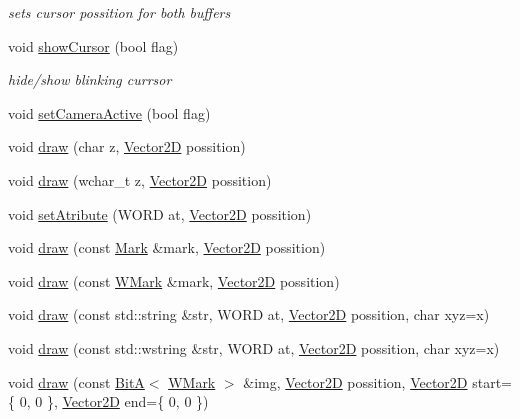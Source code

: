 \begin{DoxyCompactItemize}
\begin{DoxyCompactList}\small\item\em sets cursor possition for both buffers \end{DoxyCompactList}\item 
void \mbox{\hyperlink{classsc_1_1_console_abcbb6154c7265d8a31b46338faa4ea8f}{show\+Cursor}} (bool flag)
\begin{DoxyCompactList}\small\item\em hide/show blinking currsor \end{DoxyCompactList}\item 
void \mbox{\hyperlink{classsc_1_1_console_aa50c09dfc2a61531e5bb12456819485a}{set\+Camera\+Active}} (bool flag)
\item 
void \mbox{\hyperlink{classsc_1_1_console_a40d14517dcebf7f4ded1656efdbf5bcf}{draw}} (char z, \mbox{\hyperlink{classsc_1_1_vector2_d}{Vector2D}} possition)
\item 
void \mbox{\hyperlink{classsc_1_1_console_a86c67142b3b25386f0a2333e80db62d3}{draw}} (wchar\+\_\+t z, \mbox{\hyperlink{classsc_1_1_vector2_d}{Vector2D}} possition)
\item 
void \mbox{\hyperlink{classsc_1_1_console_af65001cc3911780cf555fdab60040a0d}{set\+Atribute}} (W\+O\+RD at, \mbox{\hyperlink{classsc_1_1_vector2_d}{Vector2D}} possition)
\item 
void \mbox{\hyperlink{classsc_1_1_console_a87065beb3ff9bcfb3eebc2d72586b3a2}{draw}} (const \mbox{\hyperlink{classsc_1_1_mark}{Mark}} \&mark, \mbox{\hyperlink{classsc_1_1_vector2_d}{Vector2D}} possition)
\item 
void \mbox{\hyperlink{classsc_1_1_console_a139ec2f3c1296b5878a4a8f0da1c30cf}{draw}} (const \mbox{\hyperlink{classsc_1_1_w_mark}{W\+Mark}} \&mark, \mbox{\hyperlink{classsc_1_1_vector2_d}{Vector2D}} possition)
\item 
void \mbox{\hyperlink{classsc_1_1_console_ae5305b5370392f5d798fdd466e017865}{draw}} (const std\+::string \&str, W\+O\+RD at, \mbox{\hyperlink{classsc_1_1_vector2_d}{Vector2D}} possition, char xyz=\textquotesingle{}x\textquotesingle{})
\item 
void \mbox{\hyperlink{classsc_1_1_console_a855cdd56ef1b7bc0117ae79f926fb4fd}{draw}} (const std\+::wstring \&str, W\+O\+RD at, \mbox{\hyperlink{classsc_1_1_vector2_d}{Vector2D}} possition, char xyz=\textquotesingle{}x\textquotesingle{})
\item 
void \mbox{\hyperlink{classsc_1_1_console_a2cf4ab527564da95b6867db3e7cd0b45}{draw}} (const \mbox{\hyperlink{classsc_1_1_bit_a}{BitA}}$<$ \mbox{\hyperlink{classsc_1_1_w_mark}{W\+Mark}} $>$ \&img, \mbox{\hyperlink{classsc_1_1_vector2_d}{Vector2D}} possition, \mbox{\hyperlink{classsc_1_1_vector2_d}{Vector2D}} start=\{ 0, 0 \}, \mbox{\hyperlink{classsc_1_1_vector2_d}{Vector2D}} end=\{ 0, 0 \})

\end{DoxyCompactItemize}
